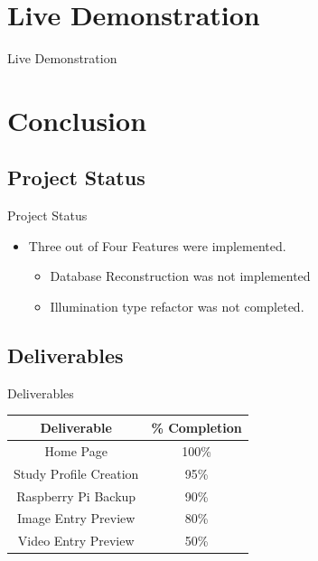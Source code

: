 \documentclass[17pt, aspectratio=169]{beamer}
\begin{document}
\section*{Live Demonstration}
\begin{frame}
	\begin{huge}
		\begin{center}
			Live Demonstration
		\end{center}
	\end{huge}
\end{frame}
\section{Conclusion}
\subsection*{Project Status}
\begin{frame}{Project Status}
	\begin{itemize}
		\item Three out of Four Features were implemented.
		      \begin{itemize}
			      \item Database Reconstruction was not implemented
			      \item Illumination type refactor was not completed.
		      \end{itemize}
	\end{itemize}
\end{frame}
\subsection{Deliverables}
\begin{frame}{Deliverables}
	\begin{center}
		\begin{tabular}{||c | c||}
			\hline
			Deliverable            & \% Completion \\
			\hline
			Home Page              & 100\%         \\
			\hline
			Study Profile Creation & 95\%          \\
			\hline
			Raspberry Pi Backup    & 90\%          \\
			\hline
			Image Entry Preview    & 80\%          \\
			\hline
			Video Entry Preview    & 50\%          \\
			\hline
		\end{tabular}
	\end{center}
\end{frame}
\end{document}
